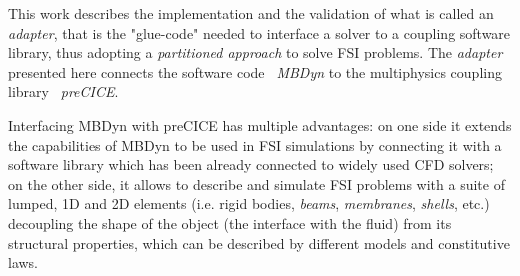 This work describes the implementation and the validation of what is called an \textit{adapter}, that is the "glue-code" needed to interface a solver to a coupling software library, thus adopting a \textit{partitioned approach} to solve FSI problems. The \textit{adapter} presented here connects the software code \textit{~\ac{MBDyn}}  to the multiphysics coupling library \textit{~\ac{preCICE}}.

Interfacing MBDyn with preCICE has multiple advantages: on one side it extends the capabilities of MBDyn to be used in FSI simulations by connecting it with a software library which has been already connected to widely used CFD solvers; on the other side, it allows to describe and simulate FSI problems with a suite of lumped, 1D and 2D elements (i.e. rigid bodies, \textit{beams}, \textit{membranes}, \textit{shells}, etc.) decoupling the shape of the object (the interface with the fluid) from its structural properties, which can be described by different models and constitutive laws.  


